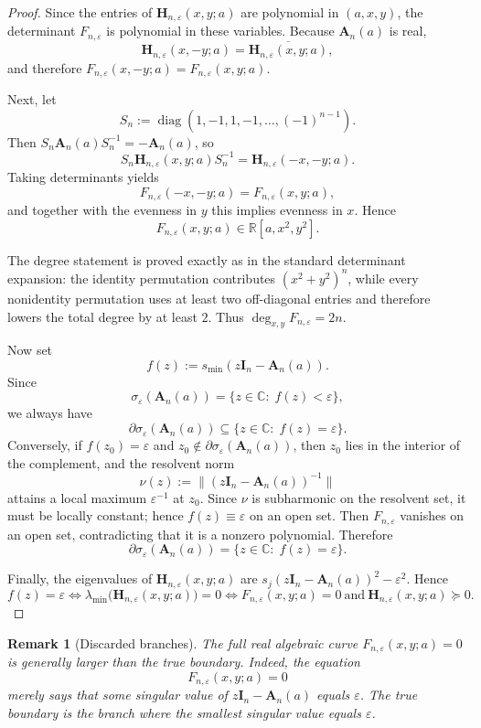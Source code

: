 \documentclass[11pt]{article}
\newtheorem{remark}[theorem]{Remark}
\DeclareMathOperator{\diag}{diag}
\newcommand{\R}{\mathbb{R}}
\newcommand{\C}{\mathbb{C}}
\begin{document}
\begin{proof}
Since the entries of \(\mathbf H_{n,\varepsilon}(x,y;a)\) are polynomial in \((a,x,y)\), the determinant \(F_{n,\varepsilon}\) is polynomial in these variables. Because \(\mathbf A_n(a)\) is real,
\[
\mathbf H_{n,\varepsilon}(x,-y;a)
=
\overline{\mathbf H_{n,\varepsilon}(x,y;a)},
\]
and therefore \(F_{n,\varepsilon}(x,-y;a)=F_{n,\varepsilon}(x,y;a)\).

Next, let
\[
S_n:=\diag(1,-1,1,-1,\dots,(-1)^{n-1}).
\]
Then \(S_n\mathbf A_n(a)S_n^{-1}=-\mathbf A_n(a)\), so
\[
S_n\mathbf H_{n,\varepsilon}(x,y;a)S_n^{-1}
=
\mathbf H_{n,\varepsilon}(-x,-y;a).
\]
Taking determinants yields
\[
F_{n,\varepsilon}(-x,-y;a)=F_{n,\varepsilon}(x,y;a),
\]
and together with the evenness in \(y\) this implies evenness in \(x\). Hence
\[
F_{n,\varepsilon}(x,y;a)\in \R[a,x^2,y^2].
\]

The degree statement is proved exactly as in the standard determinant expansion: the identity permutation contributes \((x^2+y^2)^n\), while every nonidentity permutation uses at least two off-diagonal entries and therefore lowers the total degree by at least \(2\). Thus \(\deg_{x,y}F_{n,\varepsilon}=2n\).

Now set
\[
f(z):=s_{\min}(z\mathbf I_n-\mathbf A_n(a)).
\]
Since
\[
\sigma_\varepsilon(\mathbf A_n(a))
=
\{z\in\C:\;f(z)<\varepsilon\},
\]
we always have
\[
\partial \sigma_\varepsilon(\mathbf A_n(a))
\subseteq
\{z\in\C:\;f(z)=\varepsilon\}.
\]
Conversely, if \(f(z_0)=\varepsilon\) and \(z_0\notin \partial \sigma_\varepsilon(\mathbf A_n(a))\), then \(z_0\) lies in the interior of the complement, and the resolvent norm
\[
\nu(z):=\|(z\mathbf I_n-\mathbf A_n(a))^{-1}\|
\]
attains a local maximum \(\varepsilon^{-1}\) at \(z_0\). Since \(\nu\) is subharmonic on the resolvent set, it must be locally constant; hence \(f(z)\equiv\varepsilon\) on an open set. Then \(F_{n,\varepsilon}\) vanishes on an open set, contradicting that it is a nonzero polynomial. Therefore
\[
\partial \sigma_\varepsilon(\mathbf A_n(a))
=
\{z\in\C:\;f(z)=\varepsilon\}.
\]

Finally, the eigenvalues of \(\mathbf H_{n,\varepsilon}(x,y;a)\) are \(s_j(z\mathbf I_n-\mathbf A_n(a))^2-\varepsilon^2\). Hence
\[
f(z)=\varepsilon
\iff
\lambda_{\min}\bigl(\mathbf H_{n,\varepsilon}(x,y;a)\bigr)=0
\iff
F_{n,\varepsilon}(x,y;a)=0
\ \text{and}\ 
\mathbf H_{n,\varepsilon}(x,y;a)\succeq 0.
\]
\end{proof}

\begin{remark}[Discarded branches]\label{rem:discarded-branches}
The full real algebraic curve \(F_{n,\varepsilon}(x,y;a)=0\) is generally larger than the true boundary. Indeed, the equation
\[
F_{n,\varepsilon}(x,y;a)=0
\]
merely says that \emph{some} singular value of \(z\mathbf I_n-\mathbf A_n(a)\) equals \(\varepsilon\). The true boundary is the branch where the \emph{smallest} singular value equals \(\varepsilon\).
\end{remark}
\end{document}
